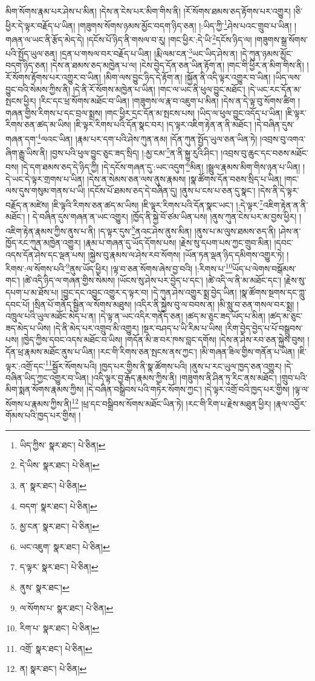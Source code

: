 མིག་སོགས་རྣམ་པར་ཤེས་པ་མིན། །དེས་ན་ངེས་པར་མིག་གིས་ནི། །རོ་སོགས་ཐམས་ཅད་རྟོགས་པར་འགྱུར། །ཅི་ཕྱིར་དེ་ལྟར་བརྗོད་པ་ཡིན། །གཟུགས་སོགས་ཉམས་མྱོང་བདག་ཉིད་ཅན། །:ཡིད་ཀྱི་\footnote{ཡིད་ཀྱིས་  སྣར་ཐང་།  པེ་ཅིན། }ཤེས་པའང་གྲུབ་པ་ཡིན། །གཞན་ལ་ཡང་ནི་རྩོད་མེད་དེ། །དངོས་པོ་ཉིད་ནི་གསལ་བ་རུ། །གང་ཕྱིར་:དེ་ཡི་\footnote{དེ་ཡིས་  སྣར་ཐང་།  པེ་ཅིན། }དངོས་ཉིད་ལ། །གཟུགས་སྒྲ་སོགས་པའི་སྤྱོད་ཡུལ་ཅན། །དྲན་པ་གསལ་བར་བརྗོད་པ་ཡིན། །རྨི་ལམ་ངན་\footnote{ན་  སྣར་ཐང་།  པེ་ཅིན། }ཡང་ཡིད་ཤེས་ན། །དེ་ཀུན་ཉམས་མྱོང་བདག་ཉིད་ཅན། །དེས་ན་ཐམས་ཅད་མཁྱེན་པ་ལ། །ངེས་བྱེད་དོན་ཅན་ཡིན་རྟོག་ན། །གང་གི་ཕྱིར་ན་མིག་གིས་ནི། །རོ་སོགས་རྟོགས་པར་འགྱུར་བ་ཡིན། །མིག་ལས་བྱུང་ཉིད་དེ་རྟོག་ན། །སྐྱོན་ནི་འདི་ལྟར་འགྱུར་བ་ཡིན། །ཡིད་ལས་བྱུང་བའི་སེམས་ཀྱིས་ནི། །དེ་ནི་རོ་སོགས་མཁྱེན་པ་ཡིན། །གང་ལ་ཡང་ནི་ཕུལ་བྱུང་མཐོང་། །དེ་ཡང་རང་དོན་མ་སྤངས་ཕྱིར། །རིང་དང་ཕྲ་སོགས་མཐོང་བ་ཡིན། །གཟུགས་ལ་རྣ་བ་འཇུག་པ་མིན། །དེས་ན་དེ་ལྟ་བུ་སོགས་ཚིག །གཞན་གྱིས་རིགས་པ་དང་བྲལ་སྨྲས། །གང་ཕྱིར་དྲང་དོན་མ་སྤངས་པས། །ཡིད་ལ་ཕུལ་བྱུང་འདོད་པ་ཡིན། །ཇི་ལྟར་རིགས་ཅན་ཚད་མ་ཡིས། །ཇི་ལྟར་རིགས་པའི་དོན་སྣང་བར། །ད་ལྟར་འཇིག་རྟེན་ན་ནི་མཐོང་། །དེ་བཞིན་དུས་གཞན་དག་\footnote{བདག་  སྣར་ཐང་།  པེ་ཅིན། }ལའང་ཡིན། །རྣམ་པར་དག་པའི་ཤེས་ཀུན་ནམ། །དོན་ཀུན་སྤྱོད་ཡུལ་ཅན་ཡིན་ཏེ། །འབྲས་བུ་འགའ་ཞིག་རྒྱུ་ཡིས་ནི། །བྱས་པའི་ཕུལ་བྱུང་ཅུང་ཟད་སྲིད། །:མྱ་ངམ་\footnote{མྱ་ངན་  སྣར་ཐང་།  པེ་ཅིན། }ན་ནི་སྐྱུ་རུའི་ཤིང་། །འབྲས་བུ་ཆུང་དང་བཅས་མཐོང་བས། །དེ་དག་ཐམས་ཅད་དེ་ཉིད་ཀྱི། །དེ་དངོས་གཞན་དུ་:ཡང་འདུག་\footnote{ཡང་འཇུག་  སྣར་ཐང་།  པེ་ཅིན། }མིན། །སྦྲུལ་རྣམས་མིག་གིས་ཉན་པ་ཡིན། །དེ་ཡང་དེ་ལྟར་གྲགས་པ་ཡིན། །དེས་ན་སེམས་ཅན་ལས་ནུས་རྣམས། །སྣ་ཚོགས་དོན་བཅས་སྲིད་པ་ཡིན། །གང་ལས་དུས་གསུམ་གནས་པ་ཡི། །དངོས་པོ་ཐམས་ཅད་དེ་བཞིན་དུ། །ནུས་པ་ངས་པ་ཅན་དུ་སྣང་། །དེས་ནི་དེ་ལྟར་བརྗོད་ན་མཛེས། །ཇི་ལྟའི་རིགས་ཅན་ཚད་མ་ཡིས། །ཇི་ལྟར་རིགས་པའི་དོན་སྣང་ཡང་། །:དེ་ལྟར་\footnote{ད་ལྟར་  སྣར་ཐང་།  པེ་ཅིན། }འཇིག་རྟེན་ན་ནི་མཐོང་། །
དེ་བཞིན་དུས་གཞན་ན་ཡང་འགྱུར། །ཁྱོད་ནི་སྐྱེ་བོ་ཙམ་ཡིན་པས། །ནུས་ཀུན་ངེས་པར་མ་བྱས་ཕྱིར། །འཇིག་རྟེན་རྣམས་ཀྱིས་ནུས་པ་ནི། །ད་ལྟར་དུས་\footnote{ནུས་  སྣར་ཐང་། }ནའང་ཤེས་ནུས་མིན། །ནུས་པ་མ་ལུས་ཐམས་ཅད་ནི། །ཤེས་ན་ཁྱོད་རང་ཀུན་མཁྱེན་འགྱུར། །རྣམ་པ་གཞན་དུ་ཡོད་དོགས་པས། །རྗེས་སུ་དཔག་པས་ཀྱང་གྲུབ་མིན། །དབང་འདས་དོན་ཤེས་དང་ལྡན་པས། །སྐྱེས་བུ་རྣམས་ལ་ཤེས་རབ་སོགས། །ཡོན་ཏན་ལྡན་ཉིད་དམིགས་འགྱུར་ཏེ། །རིགས་:ལ་སོགས་པའི་\footnote{ལ་སོགས་པ་  སྣར་ཐང་།  པེ་ཅིན། }ནུས་ཡོད་ཕྱིར། །ལྟ་བ་ཅན་སོགས་ཞེས་བྱ་བའི། །:རིགས་པ་\footnote{རིག་པ་  སྣར་ཐང་།  པེ་ཅིན། }ཡོད་པ་ལེགས་བསྒོམས་གང་། །ཚེ་འདི་ཉིད་ལ་གཞན་གྱིས་སེམས། །ཡོངས་སུ་ཤེས་པར་བྱེད་པ་དང་། །ཚེ་འདི་ལ་ནི་མ་མཐོང་དང་། །རྗེས་སུ་དཔག་པ་མ་ཐོས་པ། །བྱུང་དང་འབྱུང་འགྱུར་ད་ལྟར་བ། །དེ་ཀུན་ཤེས་འགྱུར་སྨྲ་བྱེད་ཡིན། །སྣ་ཚོགས་སྔགས་དང་ཀླུ་དབང་པོ། །སྲིན་པོ་གནོད་སྦྱིན་ལ་སོགས་མཐུས། །འདིར་ནི་སྐྱེས་བུ་ལ་བབས་ན། །མི་སླུ་བ་ཅན་གསལ་བར་སྨྲ། །འཁྲུལ་པའི་ཡུལ་མཐོང་མེད་པ་ན། །དེ་ལྟ་ན་ཡང་འདིར་གནོད་ཅན། །ཚད་མ་ཅུང་ཟད་ཡོད་པ་མིན། །ཚད་མ་ཅུང་ཟད་མེད་པ་ཡིས། །དེ་ནི་མེད་པར་འགྲུབ་མི་འགྱུར། །སྔར་བཤད་པ་ཡི་རིམ་པ་ཡིས། །རིག་བྱེད་བྱེད་པ་པོ་བསྒྲུབས་པས། །ཁྱེད་ཀྱིས་དབང་འདས་མཐོང་བ་ཡིས། །གདོན་མི་ཟ་བར་ཁས་བླང་དགོས། །དེས་ན་ཤེས་རབ་ཅན་སྐྱེས་བུས། །དོན་ཕྲ་རྣམས་མཐོང་ནུས་པ་ཡིན། །རང་གི་རིགས་ཅན་སྤངས་ནས་ཀྱང་། །མི་གཞན་ཟིལ་གྱིས་གནོན་པ་ཡིན། །ཇི་ལྟར་:འགྲོ་དང་\footnote{འགྲོ་  སྣར་ཐང་།  པེ་ཅིན། }སྦྱོར་སོགས་པའི། །ཁྱད་པར་གྱིས་ནི་སྣ་ཚོགས་པའི། །ནུས་པ་རང་ཡུལ་ཁྱད་ཅན་འགྱུར། །དེ་བཞིན་ཡིད་ཀྱང་འགྱུར་བ་ཡིན། །འདི་ལྟར་བྱ་རྒོད་རྣམས་ཀྱིས་ནི། །གཟུགས་ནི་ཤིན་ཏུ་རིང་ནས་མཐོང་། །གྲུབ་པའི་མིག་སྨན་སོགས་རྣམས་ཀྱིས། །དེ་བཞིན་བསྒྲིབས་པའི་གཏེར་སོགས་ཀྱང་། །དེ་ལྟར་འགྲོ་བའི་ཁྱད་པར་གྱིས། །ལྟ་ལ་སོགས་པ་རྣམས་ཀྱིས་ནི།\footnote{ན།  སྣར་ཐང་།  པེ་ཅིན། } །ཕྲ་དང་བསྒྲིབས་སོགས་མཐོང་ཡིན་ཏེ། །རང་གི་རིག་པ་རྗེས་མཐུན་ཕྱིར། །རྣལ་འབྱོར་གོམས་པའི་ཁྱད་པར་གྱིས། །

